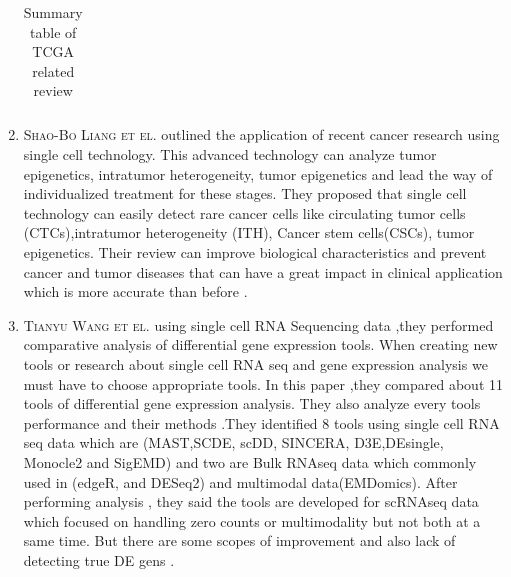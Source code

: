 \begin{enumerate}
\begin{table}[H]
\begin{tabular}{|| p{2.1cm} |p{2.1cm} |p{2.1cm} |p{1.5cm}|p{2.1cm} | p{2.1cm}||}
     
     
    \end{tabular}
    \caption{Summary table of TCGA related review}
    \label{table:1}
    \end{table}


  \item \textsc{Shao-Bo Liang et el.} outlined the application of recent cancer research using single cell technology.  This advanced technology can analyze tumor epigenetics, intratumor heterogeneity, tumor epigenetics and lead the way of individualized treatment for these stages. They proposed that single cell technology can easily detect rare cancer cells like circulating tumor cells (CTCs),intratumor heterogeneity (ITH), Cancer stem cells(CSCs), tumor epigenetics. Their review can improve biological characteristics and prevent  cancer and tumor diseases that can have a great impact in clinical application which is more accurate than before \cite{pmid10.1016}.
  
  \item \textsc{Tianyu Wang et el.} using single cell RNA Sequencing data ,they performed comparative analysis of differential gene expression tools. When creating new tools or research about single cell RNA seq and gene expression analysis we must have to choose appropriate tools. In this paper ,they compared about 11 tools of differential gene expression analysis. They also analyze every tools performance and their methods .They identified 8 tools using single cell RNA seq data which are (MAST,SCDE, scDD, SINCERA, D3E,DEsingle, Monocle2 and SigEMD) and two are Bulk RNAseq data which commonly used in (edgeR, and DESeq2) and multimodal data(EMDomics). After performing analysis , they said the tools are developed for scRNAseq data which focused on handling zero counts or multimodality but not both at a same time. But there are some scopes of improvement and also lack of detecting true DE gens \cite{Wang2019}.
  

\end{enumerate}

